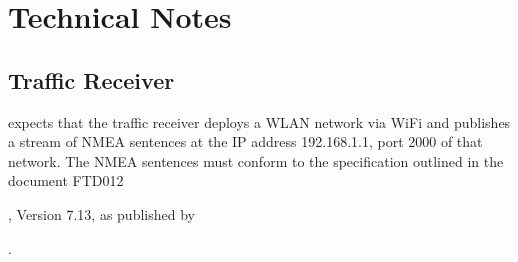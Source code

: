 \documentclass[letterpaper,10pt,english]{sphinxmanual}
\begin{document}
\chapter{Technical Notes}
\label{\detokenize{04-appendix/technical:technical-notes}}\label{\detokenize{04-appendix/technical::doc}}

\section{Traffic Receiver}
\label{\detokenize{04-appendix/technical:traffic-receiver}}
\sphinxAtStartPar
{} expects that the traffic receiver deploys a WLAN
network via Wi\sphinxhyphen{}Fi and publishes a stream of NMEA sentences at the IP address
192.168.1.1, port 2000 of that network. The NMEA sentences must conform to the
specification outlined in the document FTD\sphinxhyphen{}012 %
\begin{footnote}[33]\sphinxAtStartFootnote
{}
%
\end{footnote}, Version 7.13,
as published by %
\begin{footnote}[34]\sphinxAtStartFootnote
{}
%
\end{footnote}.
\end{document}
